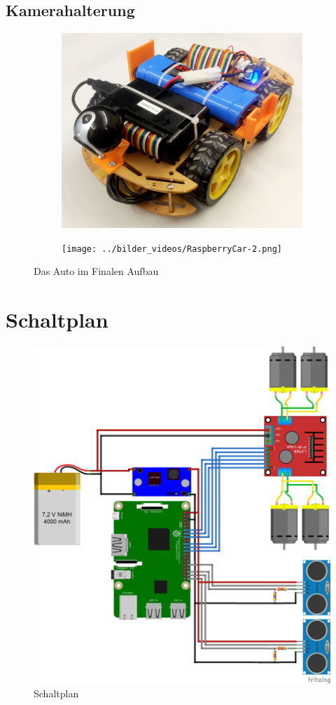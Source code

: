 \documentclass[a4paper, 12pt]{scrartcl}
\begin{document}
\subsection{Kamerahalterung}
\begin{figure}[ht!] \centering
	\begin{subfigure}{.5\textwidth} \centering
		\includegraphics[width=\textwidth]{../bilder_videos/RaspberryCar.png}
	\end{subfigure}%
	\begin{subfigure}{.5\textwidth} \centering
		\texttt{[image: ../bilder\_videos/RaspberryCar-2.png]}
	\end{subfigure}%
	\caption{Das Auto im Finalen Aufbau}
	\label{auto}
\end{figure}

\section{Schaltplan}

\begin{figure}[ht!] \centering
	\includegraphics[width=.5\textwidth]{Schaltplan_Steckplatine.png}
	\caption{Schaltplan}
	\label{schaltplan}
\end{figure}
\end{document}
